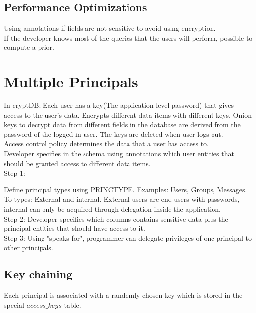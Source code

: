 \documentclass[10pt]{article}
\begin{document}
\subsection{Performance Optimizations}
Using annotations if fields are not sensitive to avoid using encryption.\\
If the developer knows most of the queries that the users will perform, possible to compute a prior.\\

\section{Multiple Principals}

In cryptDB: Each user has a key(The application level password) that gives access to the user's data. Encrypts different data items with different keys. Onion keys to decrypt data from different fields in the database are derived from the password of the logged-in user. The keys are deleted when user logs out.\\

Access control policy determines the data that a user has access to.\\

Developer specifies in the schema using annotations which user entities that should be granted access to different data items.\\


Step 1:

Define principal types using PRINCTYPE. Examples: Users, Groups, Messages.
To types: External and internal. External users are end-users with passwords, internal can only be acquired through delegation inside the application.\\

Step 2:
Developer specifies which columns contains sensitive data plus the principal entities that should have access to it.\\

Step 3:
Using "speaks for", programmer can delegate privileges of one principal to other principals.\\


\subsection{Key chaining}
Each principal is associated with a randomly chosen key which is stored in the special $access\_keys$ table.\\
\end{document}
